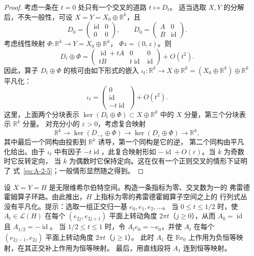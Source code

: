 \begin{proof}
考虑一条在 $t=0$ 处只有一个交叉的道路 $t\mapsto D_t$。
适当选取 $X,Y$ 的分解后，不失一般性，可设 $X=Y=X_0\oplus\mathbb R^k$，且
\[
  D_0=\begin{pmatrix}\operatorname{id}&0\\0&0\end{pmatrix},
  \qquad
  \dot D_0=\begin{pmatrix}A&0\\B&\operatorname{id}\end{pmatrix}.
\]
考虑线性映射 $\Phi:\mathbb R^k\to Y=X_0\oplus\mathbb R^k$，
$\Phi z=(0,z)$。则
\[
  D_t\oplus\Phi
  =\begin{pmatrix}
    \operatorname{id}+tA&0&0\\
    tB&t\operatorname{id}&\operatorname{id}
   \end{pmatrix}+O(t^2).
\]
因此，算子 $D_t\oplus\Phi$ 的核可由如下形式的嵌入
$\iota_t:\mathbb R^k\to X\oplus\mathbb R^k
=(X_0\oplus\mathbb R^k)\oplus\mathbb R^k$ 平凡化：
\[
  \iota_t=\begin{pmatrix}0\\\operatorname{id}\\-t\operatorname{id}\end{pmatrix}
  +O(t^2).
\]
这里，上面两个分块表示 $\ker(D_t\oplus\Phi)\subset X\oplus\mathbb R^k$
中的 $X$ 分量，第三个分块表示 $\mathbb R^k$ 分量。
对充分小的 $\varepsilon>0$，考虑复合映射
\[
  \mathbb R^k\longrightarrow\ker(D_{-\varepsilon}\oplus\Phi)
  \longrightarrow\ker(D_\varepsilon\oplus\Phi)
  \longrightarrow\mathbb R^k,
\]
其中最后一个同构由投影到 $\mathbb R^k$ 诱导，第一个同构是它的逆，
第二个同构由平凡化给出。由于 $\iota_t$ 中有因子
$-t\operatorname{id}$，此复合映射形如
$-\operatorname{id}+O(\varepsilon)$。当 $k$ 为奇数时它反转定向，
当 $k$ 为偶数时它保持定向。这在仅有一个正则交叉的情形下证明了
式~\eqref{eq:A-2-5}；一般情形显然随之得到。
\end{proof}

\begin{exercise}\label{ex:A-2-5}
设 $X=Y=H$ 是无限维希尔伯特空间。构造一条指标为零、交叉数为一的
弗雷德霍姆算子环路。由此推出，$H$ 上指标为零的弗雷德霍姆算子空间之上的
行列式丛没有平凡化。提示：选取一组正交归一基 $e_0,e_1,e_2,\ldots$。
当 $0\le t\le1/2$ 时，使 $A_t\in\mathcal L(H)$ 在每个
$(e_{2j},e_{2j+1})$ 平面上转动角度 $2\pi t$（$j\ge0$），从而
$A_0=\operatorname{id}$ 且 $A_{1/2}=-\operatorname{id}$。
当 $1/2\le t\le1$ 时，令 $A_te_0=-e_0$，并使 $A_t$ 在每个
$(e_{2j-1},e_{2j})$ 平面上转动角度 $2\pi t$（$j\ge1$）。
此时 $A_1$ 在 $\mathbb Re_0$ 上作用为负恒等映射，在其正交补上作用为恒等映射。
最后，用直线段将 $A_1$ 连到恒等映射。
\end{exercise}

